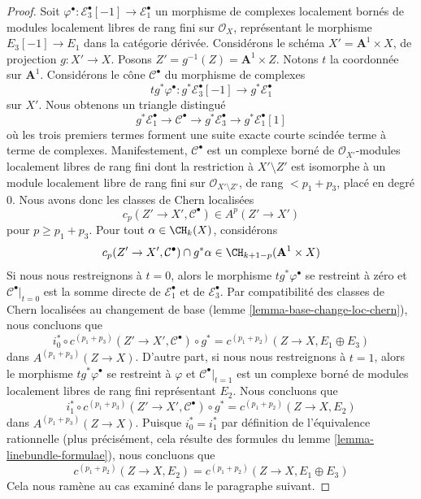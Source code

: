\begin{proof}
\medskip\noindent
Soit $\varphi^\bullet : \mathcal{E}_3^\bullet[-1] \to \mathcal{E}_1^\bullet$
un morphisme de complexes localement bornés de modules localement libres de rang fini
sur $\mathcal{O}_X$, représentant le morphisme $E_3[-1] \to E_1$
dans la catégorie dérivée. Considérons le schéma
$X' = \mathbf{A}^1 \times X$, de projection
$g : X' \to X$. Posons $Z' = g^{-1}(Z) = \mathbf{A}^1 \times Z$.
Notons $t$ la coordonnée sur $\mathbf{A}^1$. Considérons le cône
$\mathcal{C}^\bullet$ du morphisme de complexes
$$
t g^*\varphi^\bullet :
g^*\mathcal{E}_3^\bullet[-1]
\longrightarrow
g^*\mathcal{E}_1^\bullet
$$
sur $X'$. Nous obtenons un triangle distingué
$$
g^*\mathcal{E}_1^\bullet \to \mathcal{C}^\bullet \to
g^*\mathcal{E}_3^\bullet \to g^*\mathcal{E}_1^\bullet[1]
$$
où les trois premiers termes forment une suite exacte courte scindée terme à terme
de complexes. Manifestement, $\mathcal{C}^\bullet$ est un
complexe borné de $\mathcal{O}_{X'}$-modules localement libres de rang fini
dont la restriction à $X' \setminus Z'$ est isomorphe à un
module localement libre de rang fini
sur $\mathcal{O}_{X' \setminus Z'}$, de rang $< p_1 + p_3$,
placé en degré $0$. Nous avons donc les classes de Chern localisées
$$
c_p(Z' \to X', \mathcal{C}^\bullet) \in A^p(Z' \to X')
$$
pour $p \geq p_1 + p_3$. Pour tout $\alpha \in \CH_k(X)$, considérons
$$
c_p(Z' \to X', \mathcal{C}^\bullet) \cap g^*\alpha
\in \CH_{k + 1 - p}(\mathbf{A}^1 \times X)
$$
Si nous nous restreignons à $t = 0$, alors le morphisme $t g^*\varphi^\bullet$
se restreint à zéro et $\mathcal{C}^\bullet|_{t = 0}$
est la somme directe de $\mathcal{E}_1^\bullet$ et de $\mathcal{E}_3^\bullet$.
Par compatibilité des classes de Chern localisées au changement de base
(lemme \ref{lemma-base-change-loc-chern}), nous concluons que
$$
i_0^* \circ c^{(p_1 + p_3)}(Z' \to X', \mathcal{C}^\bullet) \circ g^* =
c^{(p_1 + p_2)}(Z \to X, E_1 \oplus E_3)
$$
dans $A^{(p_1 + p_3)}(Z \to X)$. D'autre part, si nous nous restreignons à $t = 1$,
alors le morphisme $t g^*\varphi^\bullet$
se restreint à $\varphi$ et $\mathcal{C}^\bullet|_{t = 1}$
est un complexe borné de modules localement libres de rang fini représentant $E_2$.
Nous concluons que
$$
i_1^* \circ c^{(p_1 + p_3)}(Z' \to X', \mathcal{C}^\bullet) \circ g^* =
c^{(p_1 + p_2)}(Z \to X, E_2)
$$
dans $A^{(p_1 + p_3)}(Z \to X)$. Puisque $i_0^* = i_1^*$ par définition de
l'équivalence rationnelle (plus précisément, cela résulte des formules du
lemme \ref{lemma-linebundle-formulae}), nous concluons que
$$
c^{(p_1 + p_2)}(Z \to X, E_2) = c^{(p_1 + p_2)}(Z \to X, E_1 \oplus E_3)
$$
Cela nous ramène au cas examiné dans le paragraphe suivant.


\end{proof}
